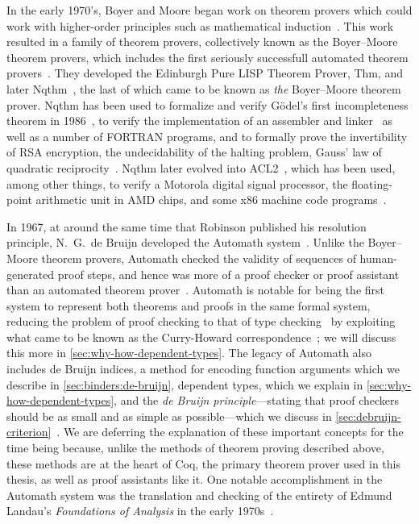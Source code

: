In the early 1970's, Boyer and Moore began work on theorem provers which could work with higher-order principles such as mathematical induction~\cite[p.~6]{Automation2013Moore}.
This work resulted in a family of theorem provers, collectively known as the Boyer--Moore theorem provers, which includes the first seriously successfull automated theorem provers~\cites[p.~8]{Automation2013Moore}{Brief2019Darbari}.
They developed the Edinburgh Pure LISP Theorem Prover, Thm, and later Nqthm~\cite[p.~8]{Automation2013Moore}, the last of which came to be known as \emph{the} Boyer--Moore theorem prover.
Nqthm has been used to formalize and verify G\"odel's first incompleteness theorem in 1986~\cites{Metamathematics1994Shankar}[p.~29]{Milestones2019Moore}, to verify the implementation of an assembler and linker~\cite{moore2007piton} as well as a number of FORTRAN programs, and to formally prove the invertibility of RSA encryption, the undecidability of the halting problem, Gauss' law of quadratic reciprocity~\cite[pp.~28--29]{Milestones2019Moore}.
Nqthm later evolved into ACL2~\cite{Milestones2019Moore,ACL2Applications,ACL2}, which has been used, among other things, to verify a Motorola digital signal processor, the floating-point arithmetic unit in AMD chips, and some x86 machine code programs~\cite[p.~2]{Milestones2019Moore}.

In 1967, at around the same time that Robinson published his resolution principle, N.~G.~de Bruijn developed the Automath system~\cite{Automath2002Kamareddine,Survey1994deBruijn,mathematical1970Bruijn}.
Unlike the Boyer--Moore theorem provers, Automath checked the validity of sequences of human-generated proof steps, and hence was more of a proof checker or proof assistant than an automated theorem prover~\cite{ringer2020qed}.
Automath is notable for being the first system to represent both theorems and proofs in the same formal system, reducing the problem of proof checking to that of type checking~\cite{ringer2020qed} by exploiting what came to be known as the Curry-Howard correspondence~\cite{Automath2002Kamareddine}; we will discuss this more in \autoref{sec:why-how-dependent-types}.
The legacy of Automath also includes de Bruijn indices, a method for encoding function arguments which we describe in \autoref{sec:binders:de-bruijn}, dependent types, which we explain in \autoref{sec:why-how-dependent-types}, and the \emph{de Bruijn principle}---stating that proof checkers should be as small and as simple as possible---which we discuss in \autoref{sec:debruijn-criterion}~\cite{ringer2020qed,Automath2002Kamareddine}.
We are deferring the explanation of these important concepts for the time being because, unlike the methods of theorem proving described above, these methods are at the heart of Coq, the primary theorem prover used in this thesis, as well as proof assistants like it.
One notable accomplishment in the Automath system was the translation and checking of the entirety of Edmund Landau's \emph{Foundations of Analysis} in the early 1970s~\cite{Automath2002Kamareddine}.

